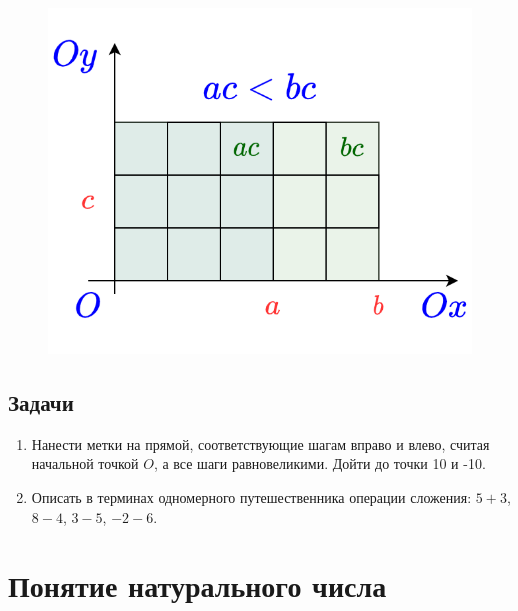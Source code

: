 \begin{enumerate}[label=P\arabic*]
\begin{figure}[hbt!]
\begin{center}
\includegraphics[scale=0.2]{monot.png}
\end{center}
\caption{}\label{monot}
\end{figure}

\end{enumerate}


\subsection*{Задачи}
\begin{enumerate}
\item Нанести метки на прямой, соответствующие шагам вправо и влево, считая начальной точкой $O$, а все шаги равновеликими. Дойти до точки 10 и -10.
\item Описать в терминах одномерного путешественника операции сложения: $5+3$, $8-4$, $3-5$, $-2-6$.
\end{enumerate}



\section{Понятие натурального числа}


